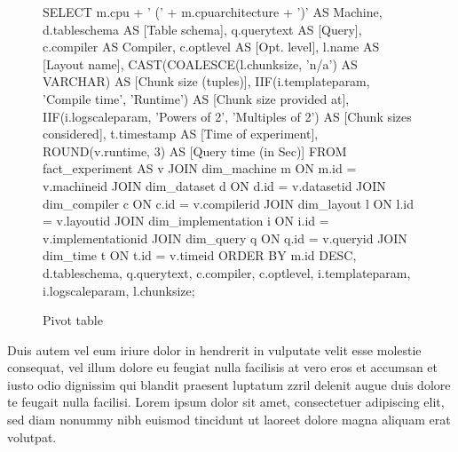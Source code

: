 \documentclass[10pt]{scrartcl}
\begin{document}
\clearpage
\begin{wrapfigure}{r}{0.52\textwidth}
{ \centering %
{SELECT
m.cpu + ' (' +  m.cpuarchitecture + ')' AS Machine,
d.tableschema   AS [Table schema],
q.querytext     AS [Query],
c.compiler      AS Compiler,
c.optlevel      AS [Opt. level],
l.name          AS [Layout name],
CAST(COALESCE(l.chunksize, 'n/a') AS VARCHAR) AS [Chunk size (tuples)],
IIF(i.templateparam, 'Compile time', 'Runtime') AS [Chunk size provided at],
IIF(i.logscaleparam, 'Powers of 2', 'Multiples of 2') AS [Chunk sizes considered],
t.timestamp 	AS [Time of experiment],
ROUND(v.runtime, 3) 		AS [Query time (in Sec)]
FROM fact_experiment AS v
    JOIN dim_machine m ON m.id = v.machineid
    JOIN dim_dataset d ON d.id = v.datasetid
    JOIN dim_compiler c ON c.id = v.compilerid
    JOIN dim_layout l ON l.id = v.layoutid
    JOIN dim_implementation i ON i.id = v.implementationid
    JOIN dim_query q ON q.id = v.queryid
    JOIN dim_time t ON t.id = v.timeid
ORDER BY m.id DESC, d.tableschema, q.querytext,
    c.compiler, c.optlevel, i.templateparam, i.logscaleparam, l.chunksize;}
\\ }
\vspace{-5pt}
\caption{Pivot table}
\vspace{-23pt}
\end{wrapfigure}
Duis autem vel eum iriure dolor in hendrerit in vulputate velit esse molestie consequat, vel illum dolore eu feugiat nulla facilisis at vero eros et accumsan et iusto odio dignissim qui blandit praesent luptatum zzril delenit augue duis dolore te feugait nulla facilisi. Lorem ipsum dolor sit amet, consectetuer adipiscing elit, sed diam nonummy nibh euismod tincidunt ut laoreet dolore magna aliquam erat volutpat.\\[8pt]
\end{document}
